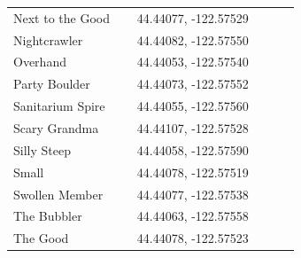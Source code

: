 \begin{flushleft}
\begin{center}
\begin{supertabular}{p{0.38\linewidth}p{0.5\linewidth}}
Next to the Good & 44.44077, -122.57529 \\
Nightcrawler & 44.44082, -122.57550 \\
Overhand & 44.44053, -122.57540 \\
Party Boulder & 44.44073, -122.57552 \\
Sanitarium Spire & 44.44055, -122.57560 \\
Scary Grandma & 44.44107, -122.57528 \\
Silly Steep & 44.44058, -122.57590 \\
Small & 44.44078, -122.57519 \\
Swollen Member & 44.44077, -122.57538 \\
The Bubbler & 44.44063, -122.57558 \\
The Good & 44.44078, -122.57523 \\

\end{supertabular}
\end{center}
\end{flushleft}
